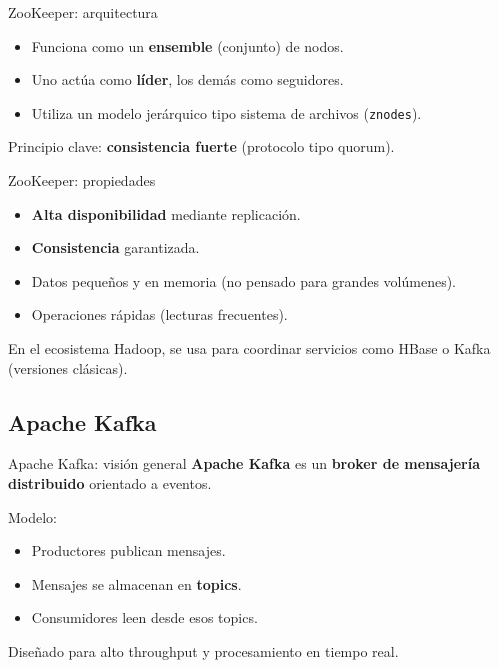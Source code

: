 \documentclass{beamer}
\begin{document}
\begin{frame}{ZooKeeper: arquitectura}
\begin{itemize}
    \item Funciona como un \textbf{ensemble} (conjunto) de nodos.
    \item Uno actúa como \textbf{líder}, los demás como seguidores.
    \item Utiliza un modelo jerárquico tipo sistema de archivos (\texttt{znodes}).
\end{itemize}

\medskip
Principio clave: \textbf{consistencia fuerte} (protocolo tipo quorum).
\end{frame}

\begin{frame}{ZooKeeper: propiedades}
\begin{itemize}
    \item \textbf{Alta disponibilidad} mediante replicación.
    \item \textbf{Consistencia} garantizada.
    \item Datos pequeños y en memoria (no pensado para grandes volúmenes).
    \item Operaciones rápidas (lecturas frecuentes).
\end{itemize}

\medskip
En el ecosistema Hadoop, se usa para coordinar servicios como HBase o Kafka (versiones clásicas).
\end{frame}

\subsection*{Apache Kafka}

\begin{frame}{Apache Kafka: visión general}
\textbf{Apache Kafka} es un \textbf{broker de mensajería distribuido} orientado a eventos.

Modelo:
\begin{itemize}
    \item Productores publican mensajes.
    \item Mensajes se almacenan en \textbf{topics}.
    \item Consumidores leen desde esos topics.
\end{itemize}

Diseñado para alto throughput y procesamiento en tiempo real.
\end{frame}
\end{document}
